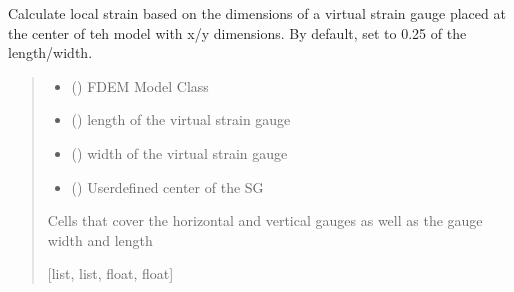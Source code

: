 \documentclass[letterpaper,10pt,english]{sphinxmanual}
\begin{document}
\begin{fulllineitems}
\label{\detokenize{openfdem:openfdem.complete_UCS_thread_pool_generators.set_strain_gauge}}
\pysigstartsignatures
{}
\pysigstopsignatures
\sphinxAtStartPar
Calculate local strain based on the dimensions of a virtual strain gauge placed at the center of teh model with
x/y dimensions. By default, set to 0.25 of the length/width.
\begin{quote}\begin{description}
\begin{itemize}
\item {} 
\sphinxAtStartPar
{} ({\hyperref[\detokenize{openfdem:openfdem.openfdem.Model}]{}}) \textendash{} FDEM Model Class

\item {} 
\sphinxAtStartPar
{} () \textendash{} length of the virtual strain gauge

\item {} 
\sphinxAtStartPar
{} () \textendash{} width of the virtual strain gauge

\item {} 
\sphinxAtStartPar
{} (\sphinxstyleliteralemphasis{\sphinxupquote{{[}}}\sphinxstyleliteralemphasis{\sphinxupquote{, }}\sphinxstyleliteralemphasis{\sphinxupquote{, }}\sphinxstyleliteralemphasis{\sphinxupquote{{]}}}) \textendash{} User\sphinxhyphen{}defined center of the SG

\end{itemize}

\sphinxAtStartPar
Cells that cover the horizontal and vertical gauges as well as the gauge width and length

\sphinxAtStartPar
{[}list, list, float, float{]}

\end{description}\end{quote}

\end{fulllineitems}
\end{document}
